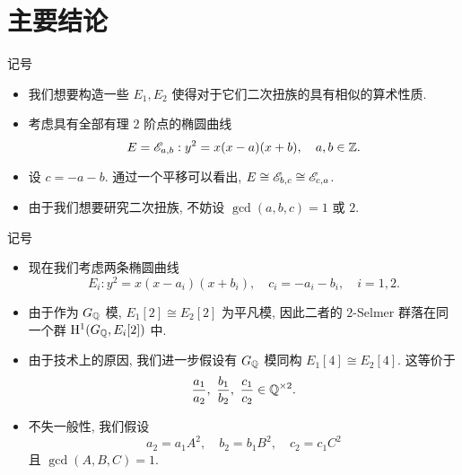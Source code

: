 \documentclass[aspectratio=169]{ctexbeamer}
\begin{document}
\section{主要结论}
\begin{frame}{记号}
\begin{itemize}
\item 我们想要构造一些 $E_1,E_2$ 使得对于它们二次扭族的具有相似的算术性质.
\item 考虑具有全部有理 $2$ 阶点的椭圆曲线
\[E=\mathscr{E}_{a,b}:y^2=x(x-a)(x+b),\quad a,b\in{\mathbb{Z}}.\]
\item 设 $c=-a-b$. 通过一个平移可以看出, $E\cong\mathscr{E}_{b,c}\cong\mathscr{E}_{c,a}$.
\item 由于我们想要研究二次扭族, 不妨设 $\gcd(a,b,c)=1$ 或 $2$.
\end{itemize}
\end{frame}

\begin{frame}[<+->]{记号}
\begin{itemize}
\item 现在我们考虑两条椭圆曲线
\[E_i:y^2=x(x-a_i)(x+b_i),\quad c_i=-a_i-b_i,\quad i=1,2.\]
\item 由于作为 $G_{\mathbb{Q}}$ 模, $E_1[2]\cong E_2[2]$ 为平凡模, 因此二者的 $2$-Selmer 群落在同一个群 ${\mathrm{H}}^1(G_{\mathbb{Q}},E_i[2])$ 中. 
\item 由于技术上的原因, 我们进一步假设有 $G_{\mathbb{Q}}$ 模同构 $E_1[4]\cong E_2[4]$.
\onslide<+->
这等价于
\[\frac{a_1}{a_2},\ \frac{b_1}{b_2},\ \frac{c_1}{c_2}\in\BQ^{\times2}.\]
\item 不失一般性, 我们假设
\[a_2=a_1 A^2,\quad b_2=b_1 B^2,\quad c_2=c_1 C^2 \]
且 $\gcd(A,B,C)=1$.
\end{itemize}
\end{frame}
\end{document}
